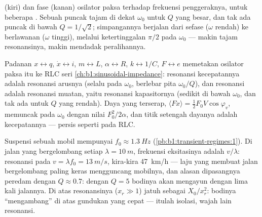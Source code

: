 \begin{omfigure}
{\small {} (kiri) dan fase (kanan) osilator paksa terhadap
frekuensi penggeraknya, untuk beberapa . Sebuah puncak
tajam di dekat $\omega_0$ untuk $Q$ yang besar, dan tak ada puncak di
bawah $Q = 1/\sqrt2$; simpangannya berjalan dari sefase ($\omega$
rendah) ke berlawanan ($\omega$ tinggi), melalui ketertinggalan $\pi/2$
pada $\omega_0$ --- makin tajam resonansinya, makin mendadak
peralihannya.}
\end{omfigure}

\begin{remark}\label{rem:b1:oscillators-resonance:analogy}
Padanan $x \leftrightarrow q$, $\dot x \leftrightarrow i$,
$m \leftrightarrow L$, $\alpha \leftrightarrow R$, $k \leftrightarrow 1/C$,
$F \leftrightarrow e$ memetakan osilator paksa itu ke RLC seri
\cref{ch:b1:sinusoidal-impedance}: resonansi kecepatannya adalah
resonansi arusnya (selalu pada $\omega_0$, berlebar pita $\omega_0/Q$),
dan resonansi  adalah resonansi muatan, yaitu resonansi
 kapasitornya (sedikit di bawah $\omega_0$, dan tak ada untuk
$Q$ yang rendah). Daya yang terserap, $\langle F\dot x\rangle
= \tfrac12 F_0V\cos\varphi_v$, memuncak pada $\omega_0$ dengan nilai
$F_0^2/2\alpha$, dan titik setengah dayanya adalah 
kecepatannya --- persis seperti pada RLC.
\end{remark}

\begin{example}\label{ex:b1:oscillators-resonance:road}
Suspensi sebuah mobil mempunyai $f_0 \approx \qty{1.3}{Hz}$
(\cref{pb:b1:transient-regimes:1}). Di jalan yang bergelombang setiap
$\lambda = \qty{10}{m}$, frekuensi eksitasinya adalah $v/\lambda$:
resonansi pada $v = \lambda f_0 = \qty{13}{m/s}$, kira-kira
\qty{47}{km/h} --- laju yang membuat jalan bergelombang paling keras
mengguncang mobilnya, dan alasan dipasangnya peredam dengan
$Q \approx 0.7$: dengan $Q = 5$ bodinya akan mengayun dengan lima kali
 jalannya. Di atas resonansinya ($x_r \gg 1$) 
jatuh sebagai $X_0/x_r^2$: bodinya ``mengambang'' di atas gundukan yang
cepat --- itulah isolasi, wajah lain resonansi.
\end{example}

